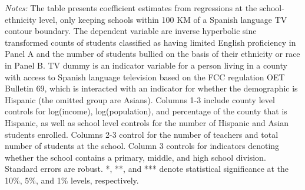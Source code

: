 \begin{table}[!htbp]
{\begin{threeparttable}
\begin{tablenotes}[flushleft]
				\item \textit{Notes:} The table presents coefficient estimates from regressions at the school-ethnicity level, only keeping schools within 100 KM of a Spanish language TV contour boundary. The dependent variable are inverse hyperbolic sine transformed counts of students classified as having limited English proficiency in Panel A and the number of students bullied on the basis of their ethnicity or race in Panel B. TV dummy is an indicator variable for a person living in a county with access to Spanish language television based on the FCC regulation OET Bulletin 69, which is interacted with an indicator for whether the demographic is Hispanic (the omitted group are Asians). Columns 1-3 include county level controls for log(income), log(population), and percentage of the county that is Hispanic, as well as school level controls for the number of Hispanic and Asian students enrolled. Columns 2-3 control for the number of teachers and total number of students at the school. Column 3 controls for indicators denoting whether the school contains a primary, middle, and high school division. Standard errors are robust. *, **, and *** denote statistical significance at the 10\%, 5\%, and 1\% levels, respectively.
			\end{tablenotes}
		\end{threeparttable}
	}
\end{table}